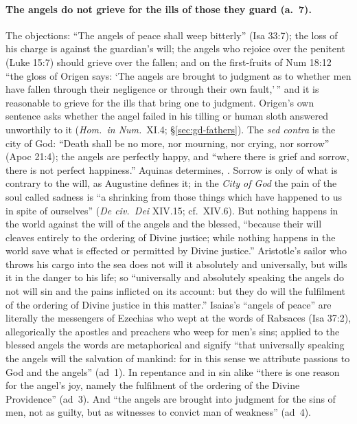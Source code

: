 \paragraph{The angels do not grieve for the ills of those they guard (a.~7).}
The objections: ``The angels of peace shall weep bitterly'' (Isa 33:7); the
loss of his charge is against the guardian's will; the angels who rejoice
over the penitent (Luke 15:7) should grieve over the fallen; and on the
first-fruits of Num 18:12 ``the gloss of Origen
says: `The angels are brought to judgment as to whether men have fallen
through their negligence or through their own fault,'\,'' and it is reasonable
to grieve for the ills that bring one to judgment. Origen's own sentence asks
whether the angel failed in his tilling or human sloth answered unworthily to
it (\emph{Hom.\ in Num.}\ XI.4; \S\ref{sec:gd-fathers}). The \emph{sed
contra} is the city of God: ``Death shall be no more, nor mourning, nor
crying, nor sorrow'' (Apoc 21:4); the angels are perfectly happy, and
``where there is grief and sorrow, there is not perfect happiness.''
Aquinas determines, . Sorrow is only of what is contrary to the will, as
Augustine defines it; in the \emph{City of God} the pain of the soul called
sadness is ``a shrinking from those things which have happened to us in
spite of ourselves'' (\emph{De civ.\ Dei} XIV.15; cf.\ XIV.6). But nothing
happens in the world against the will of the angels and the blessed,
``because their will cleaves entirely to the ordering of Divine justice;
while nothing happens in the world save what is effected or permitted by
Divine justice.'' Aristotle's sailor who throws his cargo into the sea does
not will it absolutely and universally, but wills it in the danger to his
life; so ``universally and absolutely speaking the angels do not will sin
and the pains inflicted on its account: but they do will the fulfilment of
the ordering of Divine justice in this matter.'' Isaias's ``angels of
peace'' are literally the messengers of Ezechias who wept at the words of
Rabsaces (Isa 37:2), allegorically the apostles and preachers who weep for
men's sins; applied to the blessed angels the words are metaphorical and
signify ``that universally speaking the angels will the salvation of
mankind: for in this sense we attribute passions to God and the angels''
(ad~1). In repentance and in sin alike ``there is one reason for the angel's
joy, namely the fulfilment of the ordering of the Divine Providence'' (ad~3).
And ``the angels are brought into judgment for the sins of men, not as
guilty, but as witnesses to convict man of weakness'' (ad~4).

